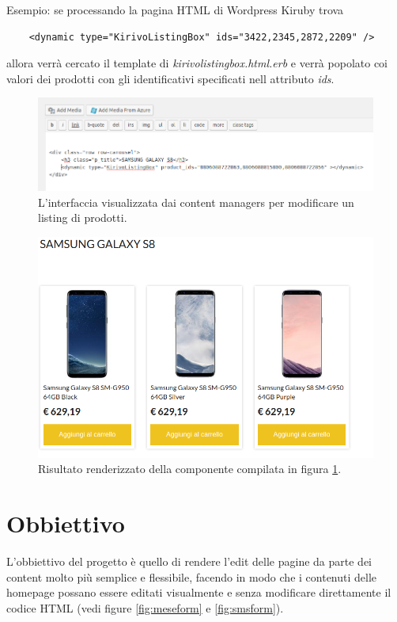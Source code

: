 Esempio: se processando la pagina HTML di Wordpress Kiruby trova
\begin{verbatim}
	<dynamic type="KirivoListingBox" ids="3422,2345,2872,2209" />
\end{verbatim}
allora verrà cercato il template di \emph{kirivolistingbox.html.erb} e verrà popolato
coi valori dei prodotti con gli identificativi specificati nell attributo \emph{ids}.


\begin{figure}
  \includegraphics[width=\textwidth]{figure/sms-html.png}
  \caption{L'interfaccia visualizzata dai content managers per modificare un listing di prodotti.}
  \label{fig:smshtml}
\end{figure}

\begin{figure}
  \includegraphics[width=\textwidth]{figure/sms-render.png}
  \caption{Risultato renderizzato della componente compilata in figura \ref{fig:smshtml}.}
  \label{fig:smsrender}
\end{figure}


\newpage

\section{Obbiettivo}
L'obbiettivo del progetto è quello di rendere l'edit delle pagine
da parte dei content molto più semplice e flessibile,
facendo in modo che i contenuti delle homepage possano essere editati visualmente e senza
modificare direttamente il codice HTML (vedi figure \ref{fig:meseform} e \ref{fig:smsform}).

